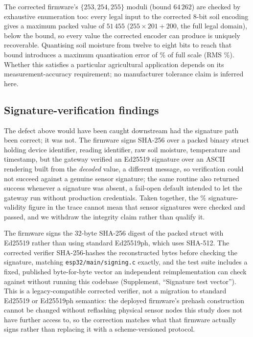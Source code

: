 \documentclass[a4paper,fleqn]{cas-sc}
\begin{document}
The corrected firmware's $\{253, 254, 255\}$ moduli (bound $64\,262$) are
checked by exhaustive enumeration too: every legal input to the corrected
8-bit soil encoding gives a maximum packed value of $51\,455$
($255 \times 201 + 200$, the full legal domain), below the bound, so
every value the corrected encoder can produce is uniquely recoverable.
Quantising soil moisture from twelve to eight bits to reach that bound
introduces a maximum quantisation error of \QuantErrMaxPct\% of full
scale (RMS \QuantErrRMSPct\%). Whether this satisfies a particular
agricultural application depends on its measurement-accuracy requirement;
no manufacturer tolerance claim is inferred here.

\subsection{Signature-verification findings}
\label{subsec:pm_signature}

The defect above would have been caught downstream had the signature path
been correct; it was not. The firmware signs SHA-256 over a packed binary
struct holding device identifier, reading identifier, raw soil moisture,
temperature and timestamp, but the gateway verified an Ed25519 signature
over an ASCII rendering built from the \emph{decoded} value, a different
message, so verification could not succeed against a genuine sensor
signature; the same routine also returned success whenever a signature
was absent, a fail-open default intended to let the gateway run without
production credentials. Taken together, the \SigValidPct\%
signature-validity figure in the trace cannot mean that sensor signatures
were checked and passed, and we withdraw the integrity claim rather than
qualify it.

The firmware signs the 32-byte SHA-256 digest of the packed struct with
Ed25519 rather than using standard Ed25519ph, which uses SHA-512.
The corrected verifier SHA-256-hashes the reconstructed bytes
before checking the signature, matching \texttt{esp32/main/signing.c}
exactly, and the test suite includes a fixed, published byte-for-byte
vector an independent reimplementation can check against without running
this codebase (Supplement, ``Signature test vector''). This is a
legacy-compatible corrected verifier, not a migration to standard
Ed25519 or Ed25519ph semantics: the deployed firmware's prehash
construction cannot be changed without reflashing physical sensor nodes
this study does not have further access to, so the correction matches
what that firmware actually signs rather than replacing it with a
scheme-versioned protocol.
\end{document}
